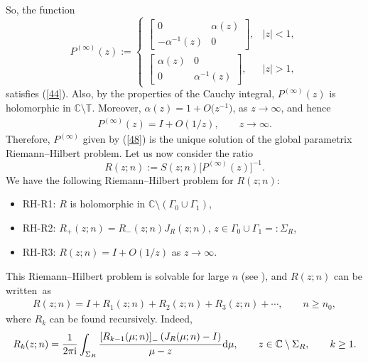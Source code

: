 \documentclass[pdftex]{sigma}
\numberwithin{equation}{section}
\newcommand{\C}{{\mathbb C}}
\newcommand{\T}{{\mathbb T}}
\newcommand{\al}{\alpha}
\newcommand{\Ga}{\Gamma}
\newcommand{\ii}{{\rm i}}
\newcommand{\dd}{{\rm d}}
\begin{document}
		So, the function \begin{equation}\label{48}
			P^{(\infty)}(z) :=\begin{cases}
				\begin{bmatrix}
					0 & \al(z) \\
					-\al^{-1}(z) & 0
				\end{bmatrix}, & |z|<1, \\[14pt]
				\begin{bmatrix}
					\al(z) & 0 \\
					0 & \al^{-1}(z)
				\end{bmatrix}, & |z|>1,
			\end{cases}
		\end{equation}
		satisfies (\ref{44}). Also, by the properties of the Cauchy integral, $P^{(\infty)}(z)$ is holomorphic in $\C \setminus \T$. Moreover, $\al(z)=1+O\big(z^{-1}\big)$, as $z\to \infty$, and hence \begin{gather*}%
			P^{(\infty)}(z)=I+O(1/z), \qquad z \to \infty.
		\end{gather*}
		Therefore, $P^{(\infty)}$ given by (\ref{48}) is the unique solution of the global parametrix Riemann--Hilbert problem. Let us now consider the ratio
		\begin{equation*}
			R(z;n):= S(z;n) \big[ P^{(\infty)}(z) \big]^{-1}.
		\end{equation*}
		We have the following Riemann--Hilbert problem for $R(z;n)$:
		\begin{itemize}\itemsep=0pt
			\item {\rm RH-R1:} $ R$ is holomorphic in $\C\setminus (\Ga_0 \cup \Ga_1)$,
			\item {\rm RH-R2:} $R_{+}(z;n)=R_{-}(z;n) J_{R}(z;n)$, $ z \in \Ga_0 \cup \Ga_1 =: \Sigma_R$,
			\item {\rm RH-R3:} $ R(z;n)=I+O(1/z) $ as $z \to \infty$.
		\end{itemize}
		This Riemann--Hilbert problem is solvable for large $n$ (see \cite{Deiftetal2, Deiftetal}), and $R(z;n)$ can be written~as
		\begin{gather*}%
			R(z;n) = I + R_1(z;n) + R_2(z;n) + R_3(z;n) + \cdots, \qquad n \geq n_0,
		\end{gather*}
		where $R_k$ can be found recursively. Indeed,
		\begin{gather*}%
			R_k(z;n) = \frac{1}{2\pi \ii}\int_{\Sigma_R} \frac{\left[ R_{k-1}(\mu;n)\right]_- \left( J_R(\mu;n)-I\right) }{\mu-z}\dd \mu, \qquad z \in \C \setminus \Sigma_R, \qquad k\geq1.
		\end{gather*}	
\end{document}
